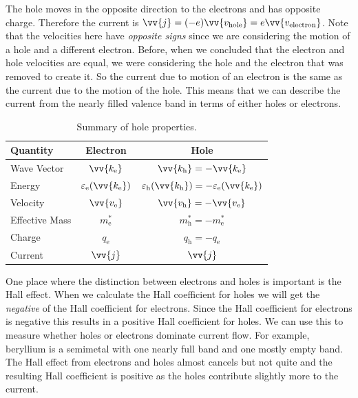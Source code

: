 \documentclass[fleqn]{NotesClass}
\begin{document}
    The hole moves in the opposite direction to the electrons and has opposite charge.
    Therefore the current is \(\vv{j} = (-e)\vv{v_{\mathrm{hole}}} = e\vv{v_{\mathrm{electron}}}\).
    Note that the velocities here have \emph{opposite signs} since we are considering the motion of a hole and a different electron.
    Before, when we concluded that the electron and hole velocities are equal, we were considering the hole and the electron that was removed to create it.
    So the current due to motion of an electron is the same as the current due to the motion of the hole.
    This means that we can describe the current from the nearly filled valence band in terms of either holes or electrons.
    
    \begin{table}
        \caption{Summary of hole properties.}
        \begin{tabular}{lcc}\toprule
            Quantity & Electron & Hole\\\midrule
            Wave Vector & \(\vv{k_{\mathrm{e}}}\) & \(\vv{k_{\mathrm{h}}} = -\vv{k_{\mathrm{e}}}\)\\
            Energy & \(\varepsilon_{\mathrm{e}}(\vv{k_{\mathrm{e}}})\) & \(\varepsilon_{\mathrm{h}}(\vv{k_{\mathrm{h}}})=-\varepsilon_{\mathrm{e}}(\vv{k_{\mathrm{e}}})\)\\
            Velocity & \(\vv{v_{\mathrm{e}}}\) & \(\vv{v_{\mathrm{h}}} = - \vv{v_{\mathrm{e}}}\)\\
            Effective Mass & \(m_{\mathrm{e}}^*\) & \(m_{\mathrm{h}}^* = - m_{\mathrm{e}}^*\)\\
            Charge & \(q_{\mathrm{e}}\) & \(q_{\mathrm{h}} = -q_{\mathrm{e}}\)\\
            Current & \(\vv{j}\) & \(\vv{j}\)\\\bottomrule
        \end{tabular}
    \end{table}
    
    One place where the distinction between electrons and holes is important is the Hall effect.
    When we calculate the Hall coefficient for holes we will get the \emph{negative} of the Hall coefficient for electrons.
    Since the Hall coefficient for electrons is negative this results in a positive Hall coefficient for holes.
    We can use this to measure whether holes or electrons dominate current flow.
    For example, beryllium is a semimetal with one nearly full band and one mostly empty band.
    The Hall effect from electrons and holes almost cancels but not quite and the resulting Hall coefficient is positive as the holes contribute slightly more to the current.
    
\end{document}
